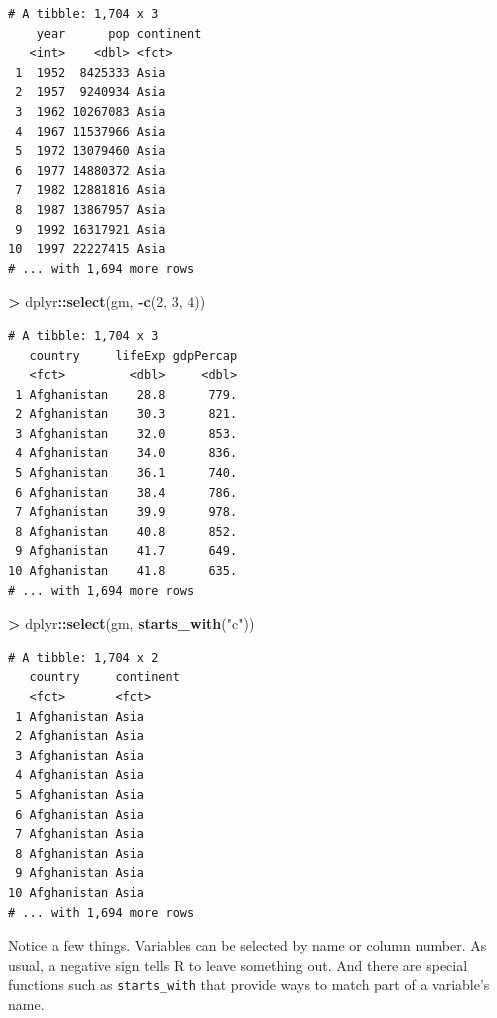 \documentclass[]{krantz}
\makeatletter
\newenvironment{Shaded}{\begin{snugshade}}{\end{snugshade}}
\newcommand{\DecValTok}[1]{\textcolor[rgb]{0.06,0.06,0.06}{#1}}
\newcommand{\KeywordTok}[1]{\textcolor[rgb]{0.27,0.27,0.27}{\textbf{#1}}}
\newcommand{\NormalTok}[1]{#1}
\newcommand{\OperatorTok}[1]{\textcolor[rgb]{0.43,0.43,0.43}{\textbf{#1}}}
\newcommand{\StringTok}[1]{\textcolor[rgb]{0.5,0.5,0.5}{#1}}
\newenvironment{kframe}{%
\medskip{}
\setlength{\fboxsep}{.8em}
 \def\at@end@of@kframe{}%
 \ifinner\ifhmode%
  \def\at@end@of@kframe{\end{minipage}}%
  \begin{minipage}{\columnwidth}%
 \fi\fi%
 \def\FrameCommand##1{\hskip\@totalleftmargin \hskip-\fboxsep
 \colorbox{shadecolor}{##1}\hskip-\fboxsep
     \hskip-\linewidth \hskip-\@totalleftmargin \hskip\columnwidth}%
 \MakeFramed {\advance\hsize-\width
   \@totalleftmargin\z@ \linewidth\hsize
   \@setminipage}}%
 {\par\unskip\endMakeFramed%
 \at@end@of@kframe}
\renewenvironment{Shaded}{\begin{kframe}}{\end{kframe}}
\makeatother
\begin{document}
\begin{verbatim}
# A tibble: 1,704 x 3
    year      pop continent
   <int>    <dbl> <fct>    
 1  1952  8425333 Asia     
 2  1957  9240934 Asia     
 3  1962 10267083 Asia     
 4  1967 11537966 Asia     
 5  1972 13079460 Asia     
 6  1977 14880372 Asia     
 7  1982 12881816 Asia     
 8  1987 13867957 Asia     
 9  1992 16317921 Asia     
10  1997 22227415 Asia     
# ... with 1,694 more rows
\end{verbatim}

\begin{Shaded}
\begin{Highlighting}[]
\OperatorTok{>}\StringTok{ }\NormalTok{dplyr}\OperatorTok{::}\KeywordTok{select}\NormalTok{(gm, }\OperatorTok{-}\KeywordTok{c}\NormalTok{(}\DecValTok{2}\NormalTok{, }\DecValTok{3}\NormalTok{, }\DecValTok{4}\NormalTok{))}
\end{Highlighting}
\end{Shaded}

\begin{verbatim}
# A tibble: 1,704 x 3
   country     lifeExp gdpPercap
   <fct>         <dbl>     <dbl>
 1 Afghanistan    28.8      779.
 2 Afghanistan    30.3      821.
 3 Afghanistan    32.0      853.
 4 Afghanistan    34.0      836.
 5 Afghanistan    36.1      740.
 6 Afghanistan    38.4      786.
 7 Afghanistan    39.9      978.
 8 Afghanistan    40.8      852.
 9 Afghanistan    41.7      649.
10 Afghanistan    41.8      635.
# ... with 1,694 more rows
\end{verbatim}

\begin{Shaded}
\begin{Highlighting}[]
\OperatorTok{>}\StringTok{ }\NormalTok{dplyr}\OperatorTok{::}\KeywordTok{select}\NormalTok{(gm, }\KeywordTok{starts_with}\NormalTok{(}\StringTok{"c"}\NormalTok{))}
\end{Highlighting}
\end{Shaded}

\begin{verbatim}
# A tibble: 1,704 x 2
   country     continent
   <fct>       <fct>    
 1 Afghanistan Asia     
 2 Afghanistan Asia     
 3 Afghanistan Asia     
 4 Afghanistan Asia     
 5 Afghanistan Asia     
 6 Afghanistan Asia     
 7 Afghanistan Asia     
 8 Afghanistan Asia     
 9 Afghanistan Asia     
10 Afghanistan Asia     
# ... with 1,694 more rows
\end{verbatim}

Notice a few things. Variables can be selected by name or column number. As usual, a negative sign tells R to leave something out. And there are special functions such as \texttt{starts\_with} that provide ways to match part of a variable's name.
\end{document}
